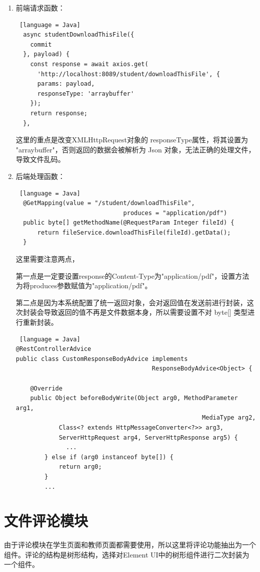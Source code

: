 \begin{enumerate}
  \item 前端请求函数：
        \begin{lstlisting} [language = Java]
  async studentDownloadThisFile({
    commit
  }, payload) {
    const response = await axios.get(
      'http://localhost:8089/student/downloadThisFile', {
      params: payload,
      responseType: 'arraybuffer'
    });
    return response;
  },
  \end{lstlisting}
        这里的重点是改变XMLHttpRequest对象的 responseType属性，将其设置为 "arraybuffer"，否则返回的数据会被解析为 Json 对象，无法正确的处理文件，导致文件乱码。
  \item 后端处理函数：
        \begin{lstlisting} [language = Java]
  @GetMapping(value = "/student/downloadThisFile", 
                              produces = "application/pdf")
  public byte[] getMethodName(@RequestParam Integer fileId) {
      return fileService.downloadThisFile(fileId).getData();
  }
  \end{lstlisting}
        这里需要注意两点，

        第一点是一定要设置response的Content-Type为"application/pdf"，设置方法为将produces参数赋值为"application/pdf"。

        第二点是因为本系统配置了统一返回对象，会对返回值在发送前进行封装，这次封装会导致返回的值不再是文件数据本身，所以需要设置不对 byte[] 类型进行重新封装。
        \begin{lstlisting} [language = Java]
@RestControllerAdvice
public class CustomResponseBodyAdvice implements 
                                      ResponseBodyAdvice<Object> {

    @Override
    public Object beforeBodyWrite(Object arg0, MethodParameter arg1, 
                                                    MediaType arg2,
            Class<? extends HttpMessageConverter<?>> arg3, 
            ServerHttpRequest arg4, ServerHttpResponse arg5) {
              ...
        } else if (arg0 instanceof byte[]) {
            return arg0;
        }
        ...
\end{lstlisting}
\end{enumerate}

\section{文件评论模块}

由于评论模块在学生页面和教师页面都需要使用，所以这里将评论功能抽出为一个组件。评论的结构是树形结构，选择对Element UI中的树形组件进行二次封装为一个组件。

